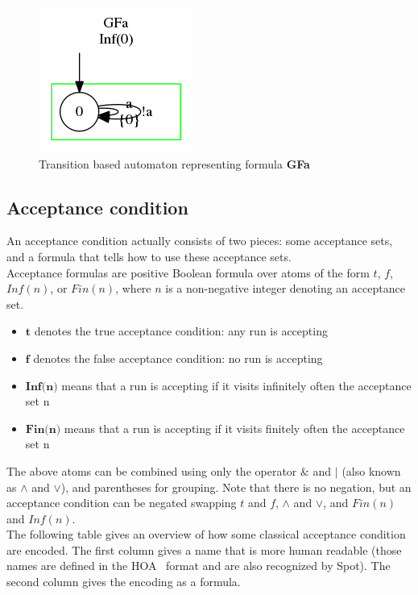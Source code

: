 \begin{figure}[H]
 \centering
 \includegraphics[scale=0.8]{img/trans_based.png}
 \caption{Transition based automaton representing formula \textbf{GFa}}
 \label{fig:transition_based}
\end{figure}

\subsection{Acceptance condition}
An acceptance condition actually consists of two pieces: some acceptance sets, and a formula that tells
how to use these acceptance sets.\\

Acceptance formulas are positive Boolean formula over atoms of the form $t$, $f$, $Inf(n)$, or $Fin(n)$,
where $n$ is a non-negative integer denoting an acceptance set.
\begin{itemize}
 \item $\textbf{t}$ denotes the true acceptance condition: any run is accepting
 \item $\textbf{f}$ denotes the false acceptance condition: no run is accepting
 \item $\textbf{Inf(n)}$ means that a run is accepting if it visits infinitely often the acceptance set n
 \item $\textbf{Fin(n)}$ means that a run is accepting if it visits finitely often the acceptance set n
\end{itemize}

The above atoms can be combined using only the operator $\&$ and $|$ (also known as $\land$ and $\lor$), and
parentheses for grouping. Note that there is no negation, but an acceptance condition can be negated
swapping $t$ and $f$, $\land$ and $\lor$, and $Fin(n)$ and $Inf(n)$.\\

The following table gives an overview of how some classical acceptance condition are encoded. The first
column gives a name that is more human readable (those names are defined in the HOA~\cite{3} format and
are also recognized by Spot). The second column gives the encoding as a formula.

